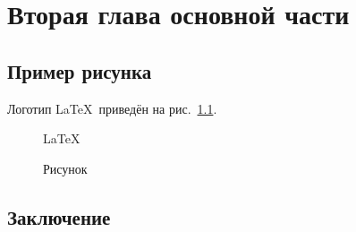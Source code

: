 \chapter{Вторая глава основной части}\label{chap:2}

\section{Пример рисунка}

Логотип \LaTeX~приведён на рис.~\ref{fig:latex}.

\begin{figure}[ht]
\centering
  \Huge\LaTeX
  \caption{Рисунок}
  \label{fig:latex}
\end{figure}

\section{Заключение}
